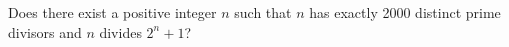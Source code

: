 Does there exist a positive integer $n$
such that $n$ has exactly 2000 distinct prime divisors
and $n$ divides $2^n + 1$?